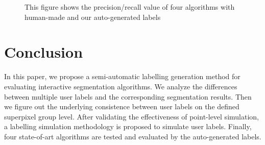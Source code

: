 \documentclass[runningheads,a4paper]{llncs}
\begin{document}
\begin{figure}[!tb]
{}
\caption{This figure shows the precision/recall value of four algorithms with human-made and our auto-generated labels }
\label{fig:pr boxplot}
\end{figure}


\section{Conclusion}

In this paper, we propose a semi-automatic labelling generation method for evaluating interactive segmentation algorithms. We analyze the differences between multiple user labels and the corresponding segmentation results. Then we figure out the underlying consistence between user labels on the defined superpixel group level. After validating the effectiveness of point-level simulation, a labelling simulation methodology is proposed to simulate user labels. Finally, four state-of-art algorithms are tested and evaluated by the auto-generated labels.
\end{document}

